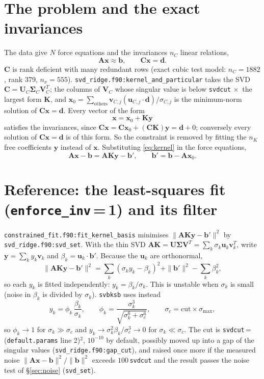 \documentclass[11pt,a4paper]{article}
\newcommand{\bA}{\mathbf A}
\newcommand{\bC}{\mathbf C}
\newcommand{\bK}{\mathbf K}
\newcommand{\bU}{\mathbf U}
\newcommand{\bV}{\mathbf V}
\newcommand{\bb}{\mathbf b}
\newcommand{\bd}{\mathbf d}
\newcommand{\bu}{\mathbf u}
\newcommand{\bv}{\mathbf v}
\newcommand{\bx}{\mathbf x}
\newcommand{\by}{\mathbf y}
\newcommand{\bSig}{\boldsymbol\Sigma}
\newcommand{\code}[1]{\texttt{#1}}
\begin{document}
\section{The problem and the exact invariances}
The data give $N$ force equations and the invariances $n_C$ linear relations,
\begin{equation}\label{eq:problem}
\bA\bx\approx\bb,\qquad \bC\bx=\bd .
\end{equation}
$\bC$ is rank deficient with many redundant rows (exact cubic test model: $n_C=1882$, rank 379,
$n_x=555$). \code{svd\_ridge.f90:kernel\_and\_particular} takes the SVD
$\bC=\bU_C\bSig_C\bV_C^T$; the columns of $\bV_C$ whose singular value is below
\code{svdcut}$\,\times$ the largest form $\bK$, and $\bx_0=\sum_{\text{others}}\bv_{C,j}(\bu_{C,j}\cdot\bd)/\sigma_{C,j}$
is the minimum-norm solution of $\bC\bx=\bd$. Every vector of the form
\begin{equation}\label{eq:kernel}
\bx=\bx_0+\bK\by
\end{equation}
satisfies the invariances, since $\bC\bx=\bC\bx_0+(\bC\bK)\by=\bd+0$; conversely every solution of
$\bC\bx=\bd$ is of this form. So the constraint is removed by fitting the $n_K$ free coefficients
$\by$ instead of $\bx$. Substituting \eqref{eq:kernel} in the force equations,
\begin{equation}\label{eq:shift}
\bA\bx-\bb=\bA\bK\by-\bb',\qquad \bb'=\bb-\bA\bx_0 .
\end{equation}

\section{\texorpdfstring{Reference: the least-squares fit (\code{enforce\_inv}\,=\,1) and its filter}{Reference: the least-squares fit (enforce\_inv = 1) and its filter}}\label{sec:svd}
\code{constrained\_fit.f90:fit\_kernel\_basis} minimises $\|\bA\bK\by-\bb'\|^2$ by \code{svd\_ridge.f90:svd\_set}.
With the thin SVD $\bA\bK=\bU\bSig\bV^T=\sum_k\sigma_k\bu_k\bv_k^T$, write $\by=\sum_k y_k\bv_k$ and
$\beta_k=\bu_k\cdot\bb'$. Because the $\bu_k$ are orthonormal,
\begin{equation}\label{eq:decouple}
\|\bA\bK\by-\bb'\|^2=\sum_k(\sigma_ky_k-\beta_k)^2+\|\bb'\|^2-\sum_k\beta_k^2 ,
\end{equation}
so each $y_k$ is fitted independently: $y_k=\beta_k/\sigma_k$. This is unstable when $\sigma_k$ is small
(noise in $\beta_k$ is divided by $\sigma_k$). \code{svbksb} uses instead
\begin{equation}\label{eq:filter}
y_k=\phi_k\,\frac{\beta_k}{\sigma_k},\qquad \phi_k=\frac{\sigma_k^3}{\sqrt{\sigma_k^6+\sigma_c^6}},\qquad
\sigma_c=\text{cut}\times\sigma_{\max},
\end{equation}
so $\phi_k\to1$ for $\sigma_k\gg\sigma_c$ and $y_k\to\sigma_k^2\beta_k/\sigma_c^3\to0$ for $\sigma_k\ll\sigma_c$.
The cut is \code{svdcut}\,=\,(\code{default.params} line 2)$^2$, $10^{-10}$ by default, possibly moved
up into a gap of the singular values (\code{svd\_ridge.f90:gap\_cut}), and raised once more if the
measured noise $\|\bA\bx-\bb\|^2/\|\bb\|^2$ exceeds $100\,$\code{svdcut} and the result passes the
noise test of \S\ref{sec:noise} (\code{svd\_set}).
\end{document}
